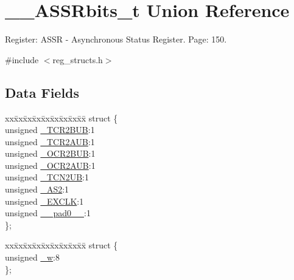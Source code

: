 \hypertarget{union_____a_s_s_rbits__t}{\section{\+\_\+\+\_\+\+A\+S\+S\+Rbits\+\_\+t Union Reference}
\label{union_____a_s_s_rbits__t}
}


Register\+: A\+S\+S\+R -\/ Asynchronous Status Register. Page\+: 150.  




{\ttfamily \#include $<$reg\+\_\+structs.\+h$>$}

\subsection*{Data Fields}
\begin{DoxyCompactItemize}
\item 
\begin{tabbing}
xx\=xx\=xx\=xx\=xx\=xx\=xx\=xx\=xx\=\kill
struct \{\\
\>unsigned \hyperlink{union_____a_s_s_rbits__t_abbc512d6ddaa410e946c079905bcabf6}{\_TCR2BUB}:1\\
\>unsigned \hyperlink{union_____a_s_s_rbits__t_a895ad7948b94b952ba633dab59b471ec}{\_TCR2AUB}:1\\
\>unsigned \hyperlink{union_____a_s_s_rbits__t_a415fb80c44c78511a8b30c0d6dce5140}{\_OCR2BUB}:1\\
\>unsigned \hyperlink{union_____a_s_s_rbits__t_a3134d4cb0de8d459d6618c5a80665254}{\_OCR2AUB}:1\\
\>unsigned \hyperlink{union_____a_s_s_rbits__t_a3182814a066ec1dc40261a56175dcb5c}{\_TCN2UB}:1\\
\>unsigned \hyperlink{union_____a_s_s_rbits__t_a5fc5ff00b5ce1cbddd1db1268521a44d}{\_AS2}:1\\
\>unsigned \hyperlink{union_____a_s_s_rbits__t_a47b1f954a274acce1746ebb0cf480bd2}{\_EXCLK}:1\\
\>unsigned \hyperlink{union_____a_s_s_rbits__t_aa0e3502d39d4b4b4f780012e7605d6d4}{\_\_pad0\_\_}:1\\
\}; \\

\end{tabbing}\item 
\begin{tabbing}
xx\=xx\=xx\=xx\=xx\=xx\=xx\=xx\=xx\=\kill
struct \{\\
\>unsigned \hyperlink{union_____a_s_s_rbits__t_a2251e5d1ea8343c04f72799bcbce3c35}{\_w}:8\\
\}; \\

\end{tabbing}\end{DoxyCompactItemize}


